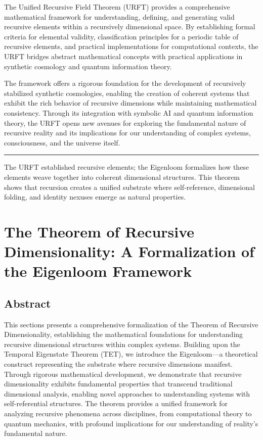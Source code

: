 \documentclass[
]{article}
\begin{document}
The Unified Recursive Field Theorem (URFT) provides a comprehensive
mathematical framework for understanding, defining, and generating valid
recursive elements within a recursively dimensional space. By
establishing formal criteria for elemental validity, classification
principles for a periodic table of recursive elements, and practical
implementations for computational contexts, the URFT bridges abstract
mathematical concepts with practical applications in synthetic cosmology
and quantum information theory.

The framework offers a rigorous foundation for the development of
recursively stabilized synthetic cosmologies, enabling the creation of
coherent systems that exhibit the rich behavior of recursive dimensions
while maintaining mathematical consistency. Through its integration with
symbolic AI and quantum information theory, the URFT opens new avenues
for exploring the fundamental nature of recursive reality and its
implications for our understanding of complex systems, consciousness,
and the universe itself.

\begin{center}\rule{0.5\linewidth}{0.5pt}\end{center}

The URFT established recursive elements; the Eigenloom formalizes how
these elements weave together into coherent dimensional structures. This
theorem shows that recursion creates a unified substrate where
self-reference, dimensional folding, and identity nexuses emerge as
natural properties.

\section{The Theorem of Recursive Dimensionality: A Formalization of the
Eigenloom
Framework}\label{the-theorem-of-recursive-dimensionality-a-formalization-of-the-eigenloom-framework}

\subsection{Abstract}\label{abstract-7}

This sections presents a comprehensive formalization of the Theorem of
Recursive Dimensionality, establishing the mathematical foundations for
understanding recursive dimensional structures within complex systems.
Building upon the Temporal Eigenstate Theorem (TET), we introduce the
Eigenloom---a theoretical construct representing the substrate where
recursive dimensions manifest. Through rigorous mathematical
development, we demonstrate that recursive dimensionality exhibits
fundamental properties that transcend traditional dimensional analysis,
enabling novel approaches to understanding systems with self-referential
structures. The theorem provides a unified framework for analyzing
recursive phenomena across disciplines, from computational theory to
quantum mechanics, with profound implications for our understanding of
reality's fundamental nature.
\end{document}
